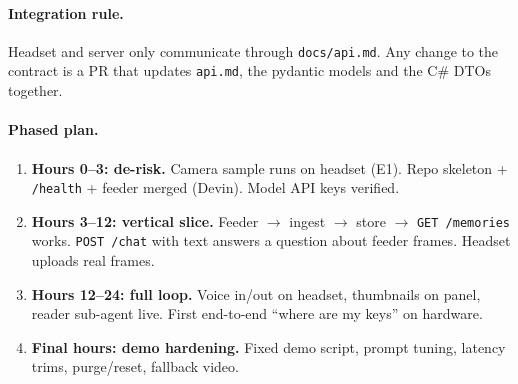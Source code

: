 \documentclass[11pt,a4paper]{article}
\begin{document}
\paragraph{Integration rule.} Headset and server only communicate through \texttt{docs/api.md}. Any change to the contract is a PR that updates \texttt{api.md}, the pydantic models and the C\# DTOs together.

\paragraph{Phased plan.}
\begin{enumerate}
  \item \textbf{Hours 0--3: de-risk.} Camera sample runs on headset (E1). Repo skeleton + \texttt{/health} + feeder merged (Devin). Model API keys verified.
  \item \textbf{Hours 3--12: vertical slice.} Feeder $\rightarrow$ ingest $\rightarrow$ store $\rightarrow$ \texttt{GET /memories} works. \texttt{POST /chat} with text answers a question about feeder frames. Headset uploads real frames.
  \item \textbf{Hours 12--24: full loop.} Voice in/out on headset, thumbnails on panel, reader sub-agent live. First end-to-end ``where are my keys'' on hardware.
  \item \textbf{Final hours: demo hardening.} Fixed demo script, prompt tuning, latency trims, purge/reset, fallback video.
\end{enumerate}

\end{document}
